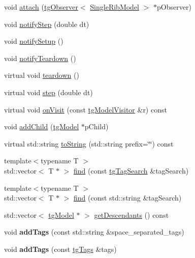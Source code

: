 \begin{DoxyCompactItemize}
\item 
void \hyperlink{classtg_subject_a56ecfd33a048c3a7f1a884318d9af548}{attach} (\hyperlink{classtg_observer}{tg\-Observer}$<$ \hyperlink{class_single_rib_model}{Single\-Rib\-Model} $>$ $\ast$p\-Observer)
\item 
void \hyperlink{classtg_subject_ad9640aa7fcc1e0b4ce8a913a4ce1ea42}{notify\-Step} (double dt)
\item 
void \hyperlink{classtg_subject_a80799e5d0c8512d3d05a55764790392b}{notify\-Setup} ()
\item 
void \hyperlink{classtg_subject_adf7a60dbb0faf0de5528f862e7953e63}{notify\-Teardown} ()
\item 
virtual void \hyperlink{classtg_model_adb5eec1dcf70a8c039850aea144dcc7e}{teardown} ()
\item 
virtual void \hyperlink{classtg_model_acc6f9ae005f9f51447d7efe5f1815737}{step} (double dt)
\item 
virtual void \hyperlink{classtg_model_aee6457e0fc54d5570b87bfc779f9b1c0}{on\-Visit} (const \hyperlink{classtg_model_visitor}{tg\-Model\-Visitor} \&r) const 
\item 
void \hyperlink{classtg_model_a292c17848b96caee32b2286e44c13f2f}{add\-Child} (\hyperlink{classtg_model}{tg\-Model} $\ast$p\-Child)
\item 
virtual std\-::string \hyperlink{classtg_model_af37b0c1a6d4060bfe0bb9b5038a17725}{to\-String} (std\-::string prefix=\char`\"{}\char`\"{}) const 
\item 
{\footnotesize template$<$typename T $>$ }\\std\-::vector$<$ T $\ast$ $>$ \hyperlink{classtg_model_ab75836fdfbd9200f165c3b28a19630c0}{find} (const \hyperlink{classtg_tag_search}{tg\-Tag\-Search} \&tag\-Search)
\item 
{\footnotesize template$<$typename T $>$ }\\std\-::vector$<$ T $\ast$ $>$ \hyperlink{classtg_model_aa40b5fb32f8941e04d537f4e6c6db35c}{find} (const std\-::string \&tag\-Search)
\item 
std\-::vector$<$ \hyperlink{classtg_model}{tg\-Model} $\ast$ $>$ \hyperlink{classtg_model_a2efa4321fa5c77b4ce23b01f6fd3a1c4}{get\-Descendants} () const 
\item 
\hypertarget{classtg_taggable_af0b8f1729653b0b90d2fecbd51163612}{void {\bfseries add\-Tags} (const std\-::string \&space\-\_\-separated\-\_\-tags)}\label{classtg_taggable_af0b8f1729653b0b90d2fecbd51163612}

\item 
\hypertarget{classtg_taggable_af28e3fe1a7e4eb28772dc006d575dd1f}{void {\bfseries add\-Tags} (const \hyperlink{classtg_tags}{tg\-Tags} \&tags)}\label{classtg_taggable_af28e3fe1a7e4eb28772dc006d575dd1f}


\end{DoxyCompactItemize}
